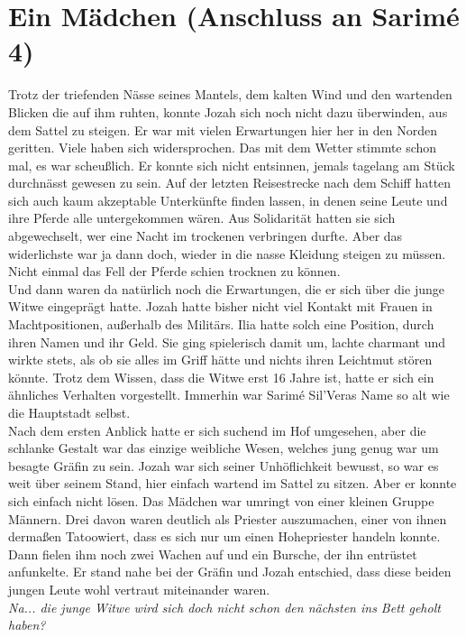 \chapter{Ein Mädchen (Anschluss an Sarimé 4)}

Trotz der triefenden Nässe seines Mantels, dem kalten Wind und den wartenden Blicken die auf ihm 
ruhten, konnte Jozah sich noch nicht dazu überwinden, aus dem Sattel zu steigen. Er war mit vielen 
Erwartungen hier her in den Norden geritten. Viele haben sich widersprochen. Das mit dem Wetter 
stimmte schon mal, es war scheußlich. Er konnte sich nicht entsinnen, jemals tagelang am Stück 
durchnässt gewesen zu sein. Auf der letzten Reisestrecke nach dem Schiff hatten sich auch kaum 
akzeptable Unterkünfte finden lassen, in denen seine Leute und ihre Pferde alle untergekommen 
wären. Aus Solidarität hatten sie sich abgewechselt, wer eine Nacht im trockenen verbringen durfte. 
Aber das widerlichste war ja dann doch, wieder in die nasse Kleidung steigen zu müssen. Nicht 
einmal das Fell der Pferde schien trocknen zu können.\\
Und dann waren da natürlich noch die Erwartungen, die er sich über die junge Witwe eingeprägt 
hatte. Jozah hatte bisher nicht viel Kontakt mit Frauen in Machtpositionen, außerhalb des Militärs. 
Ilia hatte solch eine Position, durch ihren Namen und ihr Geld. Sie ging spielerisch damit um, 
lachte charmant und wirkte stets, als ob sie alles im Griff hätte und nichts ihren Leichtmut stören 
könnte. Trotz dem Wissen, dass die Witwe erst 16 Jahre ist, hatte er sich ein ähnliches Verhalten 
vorgestellt. Immerhin war Sarimé Sil'Veras Name so alt wie die Hauptstadt selbst.\\
Nach dem ersten Anblick hatte er sich suchend im Hof umgesehen, aber die schlanke Gestalt war das 
einzige weibliche Wesen, welches jung genug war um besagte Gräfin zu sein. Jozah war sich seiner 
Unhöflichkeit bewusst, so war es weit über seinem Stand, hier einfach wartend im Sattel zu sitzen. 
Aber er konnte sich einfach nicht lösen. Das Mädchen war umringt von einer kleinen Gruppe Männern. 
Drei davon waren deutlich als Priester auszumachen, einer von ihnen dermaßen Tatoowiert, dass es 
sich nur um einen Hohepriester handeln konnte. Dann fielen ihm noch zwei Wachen auf und ein 
Bursche, der ihn entrüstet anfunkelte. Er stand nahe bei der Gräfin und Jozah entschied, dass diese 
beiden jungen Leute wohl vertraut miteinander waren.\\
\textit{Na... die junge Witwe wird sich doch nicht schon den nächsten ins Bett geholt haben?}\\
